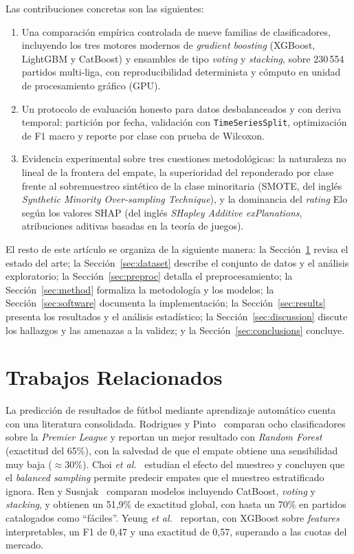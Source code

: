 \documentclass[conference]{IEEEtran}
\begin{document}
Las contribuciones concretas son las siguientes:
\begin{enumerate}
\item Una comparaci\'on emp\'irica controlada de nueve familias de clasificadores, incluyendo los tres motores modernos de \emph{gradient boosting}
      (XGBoost, LightGBM y CatBoost) y ensambles de tipo \emph{voting} y
      \emph{stacking}, sobre 230\,554 partidos multi-liga, con reproducibilidad
      determinista y c\'omputo en unidad de procesamiento gr\'afico (GPU).
\item Un protocolo de evaluaci\'on honesto para datos desbalanceados y con deriva
      temporal: partici\'on por fecha, validaci\'on con \texttt{TimeSeriesSplit},
      optimizaci\'on de F1 macro y reporte por clase con prueba de Wilcoxon.
\item Evidencia experimental sobre tres cuestiones metodol\'ogicas: la naturaleza no
      lineal de la frontera del empate, la superioridad del reponderado por clase frente
      al sobremuestreo sint\'etico de la clase minoritaria (SMOTE, del ingl\'es
      \emph{Synthetic Minority Over-sampling Technique}), y la dominancia del
      \emph{rating} Elo seg\'un los valores SHAP (del ingl\'es \emph{SHapley Additive
      exPlanations}, atribuciones aditivas basadas en la teor\'ia de juegos).
\end{enumerate}

El resto de este art\'iculo se organiza de la siguiente manera: la Secci\'on~\ref{sec:related}
revisa el estado del arte; la Secci\'on~\ref{sec:dataset} describe el conjunto de datos y
el an\'alisis exploratorio; la Secci\'on~\ref{sec:preproc} detalla el preprocesamiento; la
Secci\'on~\ref{sec:method} formaliza la metodolog\'ia y los modelos; la
Secci\'on~\ref{sec:software} documenta la implementaci\'on; la Secci\'on~\ref{sec:results}
presenta los resultados y el an\'alisis estad\'istico; la Secci\'on~\ref{sec:discussion}
discute los hallazgos y las amenazas a la validez; y la Secci\'on~\ref{sec:conclusions}
concluye.

\section{Trabajos Relacionados}\label{sec:related}
La predicci\'on de resultados de f\'utbol mediante aprendizaje autom\'atico cuenta con una
literatura consolidada. Rodrigues y Pinto~\cite{rodrigues2022} comparan ocho clasificadores
sobre la \emph{Premier League} y reportan un mejor resultado con \emph{Random Forest}
(exactitud del 65\%), con la salvedad de que el empate obtiene una sensibilidad muy baja
($\approx 30\%$). Choi \emph{et al.}~\cite{choi2023} estudian el efecto del muestreo y
concluyen que el \emph{balanced sampling} permite predecir empates que el muestreo
estratificado ignora. Ren y Susnjak~\cite{ren2022} comparan modelos incluyendo CatBoost,
\emph{voting} y \emph{stacking}, y obtienen un 51,9\% de exactitud global, con hasta un
70\% en partidos catalogados como ``f\'aciles''. Yeung \emph{et al.}~\cite{yeung2023}
reportan, con XGBoost sobre \emph{features} interpretables, un F1 de 0,47 y una exactitud
de 0,57, superando a las cuotas del mercado.
\end{document}
